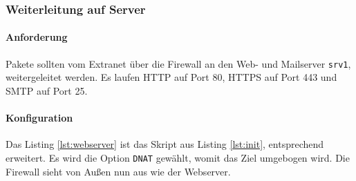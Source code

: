 \subsubsection{Weiterleitung auf Server}

\paragraph{Anforderung} Pakete sollten vom Extranet über die Firewall an
den Web- und Mailserver {\tt srv1}, weitergeleitet werden.
Es laufen HTTP auf Port 80, HTTPS auf Port 443 und SMTP auf Port 25.

\paragraph{Konfiguration} Das Listing \ref{lst:webserver} ist das Skript
aus Listing \ref{lst:init}, entsprechend erweitert.
Es wird die Option {\tt DNAT} gewählt, womit das Ziel umgebogen wird.
Die Firewall sieht von Außen nun aus wie der Webserver.


